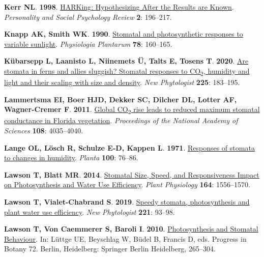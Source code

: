 \documentclass[
  letterpaper,
  DIV=11,
  numbers=noendperiod]{scrartcl}
\newlength{\cslhangindent}
\newenvironment{CSLReferences}[2] %
 {\begin{list}{}{%
  \setlength{\itemindent}{0pt}
  \setlength{\leftmargin}{0pt}
  \setlength{\parsep}{0pt}
  \ifodd #1
   \setlength{\leftmargin}{\cslhangindent}
   \setlength{\itemindent}{-1\cslhangindent}
  \fi
  \setlength{\itemsep}{#2\baselineskip}}}
 {\end{list}}
\begin{document}
\begin{CSLReferences}{0}{1}
\textbf{\textbf{Kerr NL}}. \textbf{1998}.
\href{https://doi.org/10.1207/s15327957pspr0203_4}{{HARKing}:
{Hypothesizing After} the {Results} are {Known}}. \emph{Personality and
Social Psychology Review} \textbf{2}: 196--217.

\textbf{\textbf{Knapp AK}, \textbf{Smith WK}}. \textbf{1990}.
\href{https://doi.org/10.1111/j.1399-3054.1990.tb08731.x}{Stomatal and
photosynthetic responses to variable sunlight}. \emph{Physiologia
Plantarum} \textbf{78}: 160--165.

\textbf{\textbf{Kübarsepp L}, \textbf{Laanisto L}, \textbf{Niinemets Ü},
\textbf{Talts E}, \textbf{Tosens T}}. \textbf{2020}.
\href{https://doi.org/10.1111/nph.16159}{Are stomata in ferns and allies
sluggish? {Stomatal} responses to {CO}{\textsubscript{2}}, humidity and
light and their scaling with size and density}. \emph{New Phytologist}
\textbf{225}: 183--195.

\textbf{\textbf{Lammertsma EI}, \textbf{Boer HJD}, \textbf{Dekker SC},
\textbf{Dilcher DL}, \textbf{Lotter AF}, \textbf{Wagner-Cremer F}}.
\textbf{2011}. \href{https://doi.org/10.1073/pnas.1100371108}{Global
{CO}{\textsubscript{2}} rise leads to reduced maximum stomatal
conductance in {Florida} vegetation}. \emph{Proceedings of the National
Academy of Sciences} \textbf{108}: 4035--4040.

\textbf{\textbf{Lange OL}, \textbf{Lösch R}, \textbf{Schulze E-D},
\textbf{Kappen L}}. \textbf{1971}.
\href{https://doi.org/10.1007/BF00386887}{Responses of stomata to
changes in humidity}. \emph{Planta} \textbf{100}: 76--86.

\textbf{\textbf{Lawson T}, \textbf{Blatt MR}}. \textbf{2014}.
\href{https://doi.org/10.1104/pp.114.237107}{Stomatal {Size}, {Speed},
and {Responsiveness Impact} on {Photosynthesis} and {Water Use
Efficiency}}. \emph{Plant Physiology} \textbf{164}: 1556--1570.

\textbf{\textbf{Lawson T}, \textbf{Vialet-Chabrand S}}. \textbf{2019}.
\href{https://doi.org/10.1111/nph.15330}{Speedy stomata, photosynthesis
and plant water use efficiency}. \emph{New Phytologist} \textbf{221}:
93--98.

\textbf{\textbf{Lawson T}, \textbf{Von Caemmerer S}, \textbf{Baroli I}}.
\textbf{2010}.
\href{https://doi.org/10.1007/978-3-642-13145-5_11}{Photosynthesis and
{Stomatal Behaviour}}. In: Lüttge UE, Beyschlag W, Büdel B, Francis D,
eds. Progress in {Botany} 72. Berlin, Heidelberg: Springer Berlin
Heidelberg, 265--304.


\end{CSLReferences}
\end{document}
